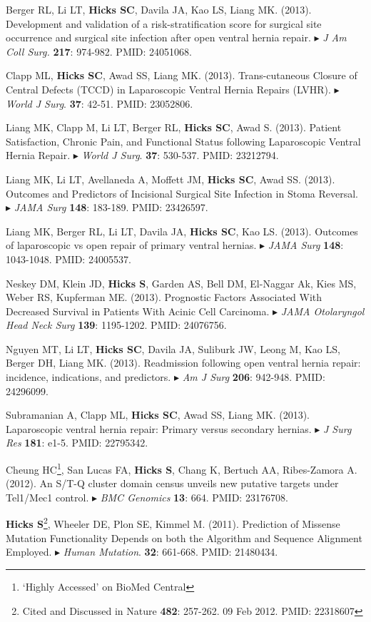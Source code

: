 \documentclass[10pt]{article}
\newcommand{\mine}{
  \addtocounter{enumi}{1}
\item[\fcolorbox{white}{grey}{\color{white} \tiny \arabic{enumi}}]
}
\newcommand{\dg}[1]{{\color{black} $\blacktriangleright$ {#1}}}
\begin{document}
\item Berger RL, Li LT, {\bf Hicks SC}, Davila JA, Kao LS, Liang MK. (2013). Development and validation of a risk-stratification score for surgical site occurrence and surgical site infection after open ventral hernia repair. \dg{{\it J Am Coll Surg.} {\bf 217}: 974-982. PMID: 24051068}.
\item Clapp ML, \textbf{Hicks SC}, Awad SS, Liang MK. (2013). Trans-cutaneous Closure of Central Defects (TCCD) in Laparoscopic Ventral Hernia Repairs (LVHR). \dg{{\it World J Surg}. {\bf 37}: 42-51. PMID: 23052806}.
\item Liang MK, Clapp M, Li LT, Berger RL, {\bf Hicks SC}, Awad S. (2013). Patient Satisfaction, Chronic Pain, and Functional Status following Laparoscopic Ventral Hernia Repair. \dg{{\it World J Surg}. {\bf 37}: 530-537. PMID: 23212794}.
\item Liang MK, Li LT, Avellaneda A, Moffett JM, {\bf Hicks SC}, Awad SS. (2013). Outcomes and Predictors of Incisional Surgical Site Infection in Stoma Reversal. \dg{{\it JAMA Surg} {\bf 148}: 183-189. PMID: 23426597}.
\item Liang MK, Berger RL, Li LT, Davila JA, {\bf Hicks SC}, Kao LS. (2013). Outcomes of laparoscopic vs open repair of primary ventral hernias. \dg{{\it JAMA Surg} {\bf 148}: 1043-1048. PMID: 24005537}.
\item Neskey DM, Klein JD, {\bf Hicks S}, Garden AS, Bell DM, El-Naggar Ak, Kies MS, Weber RS, Kupferman ME. (2013). Prognostic Factors Associated With Decreased Survival in Patients With Acinic Cell Carcinoma. \dg{{\it JAMA Otolaryngol Head Neck Surg} {\bf 139}: 1195-1202. PMID: 24076756}.
\item Nguyen MT, Li LT, {\bf Hicks SC}, Davila JA, Suliburk JW, Leong M, Kao LS, Berger DH, Liang MK. (2013). Readmission following open ventral hernia repair: incidence, indications, and predictors.\dg{{\it Am J Surg} {\bf 206}: 942-948. PMID: 24296099}.
\item Subramanian A, Clapp ML, {\bf Hicks SC}, Awad SS, Liang MK. (2013). Laparoscopic ventral hernia repair: Primary versus secondary hernias. \dg{{\it J Surg Res} {\bf 181}: e1-5. PMID: 22795342}.
\item Cheung HC\footnote{ `Highly Accessed' on BioMed Central}, San Lucas FA, \textbf{Hicks S}, Chang K, Bertuch AA, Ribes-Zamora A. (2012). An S/T-Q cluster domain census unveils new putative targets under Tel1/Mec1 control. \dg{{\it BMC Genomics} {\bf 13}: 664. PMID: 23176708}.
\mine \textbf{Hicks S}\footnote{Cited and Discussed in Nature {\bf 482}: 257-262. 09 Feb 2012. PMID: 22318607}, Wheeler DE, Plon SE, Kimmel M. (2011). Prediction of Missense Mutation Functionality Depends on both the Algorithm and Sequence Alignment Employed. \dg{{\it Human Mutation}. {\bf 32}: 661-668. PMID: 21480434}.
\end{document}
